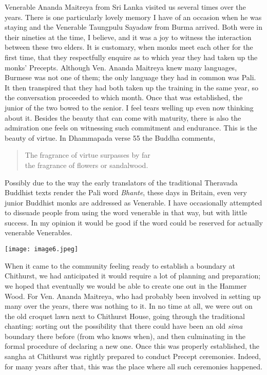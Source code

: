 Venerable Ananda Maitreya\cite{ananda}
from Sri Lanka visited us several times over
the years. There is one particularly lovely memory I have of an occasion
when he was staying and the Venerable Taungpulu Sayadaw\cite{taungpulu}
from Burma arrived. Both were in their
nineties at the time, I believe, and it was a joy to witness the
interaction between these two elders. It is customary, when monks meet
each other for the first time, that they respectfully enquire as to
which year they had taken up the monks' Precepts. Although Ven. Ananda
Maitreya knew many languages, Burmese was not one of them; the only
language they had in common was Pali. It then transpired that they had
both taken up the training in the same year, so the conversation
proceeded to which month. Once that was established, the junior of the
two bowed to the senior. I feel tears welling up even now thinking about
it. Besides the beauty that can come with maturity, there is also the
admiration one feels on witnessing such commitment and endurance. This
is the beauty of virtue. In Dhammapada verse 55 the Buddha comments,

\begin{quote}
  The fragrance of virtue surpasses by far\\
  the fragrance of flowers or sandalwood.
\end{quote}

Possibly due to the way the early translators of the traditional
Theravada Buddhist texts render the Pali word \emph{Bhante}, these days
in Britain, even very junior Buddhist monks are addressed as Venerable.
I have occasionally attempted to dissuade people from using the word
venerable in that way, but with little success. In my opinion it would
be good if the word could be reserved for actually venerable
Venerables.

\texttt{[image: image6.jpeg]}

When it came to the community feeling ready to establish a boundary\cite{sima}
at Chithurst, we had anticipated it would
require a lot of planning and preparation; we hoped that eventually we
would be able to create one out in the Hammer Wood. For Ven. Ananda
Maitreya, who had probably been involved in setting up many over the
years, there was nothing to it. In no time at all, we were out on the
old croquet lawn next to Chithurst House, going through the traditional
chanting: sorting out the possibility that there could have been an old
\emph{sima} boundary there before (from who knows when), and then
culminating in the formal procedure of declaring a new one. Once this
was properly established, the sangha at Chithurst was rightly prepared
to conduct Precept ceremonies. Indeed, for many years after that, this
was the place where all such ceremonies happened.

